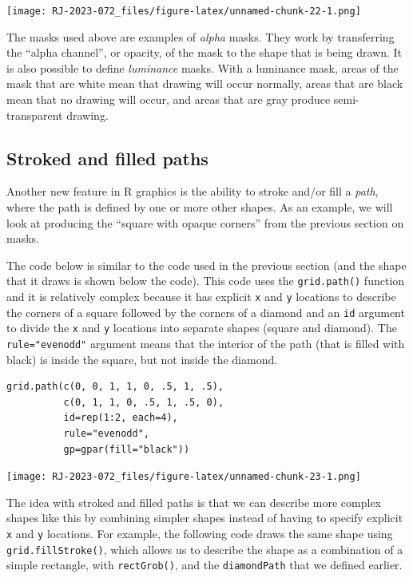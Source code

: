 \texttt{[image: RJ-2023-072\_files/figure-latex/unnamed-chunk-22-1.png]}

The masks used above are examples of \emph{alpha} masks. They work by
transferring the ``alpha channel'', or opacity, of the mask to the
shape that is being drawn.
It is also possible to define \emph{luminance} masks.
With a luminance mask, areas of the mask that are white mean that
drawing will occur normally, areas that are black mean that
no drawing will occur, and areas that are gray produce semi-transparent
drawing.

\hypertarget{stroked-and-filled-paths}{%
\subsection{Stroked and filled paths}\label{stroked-and-filled-paths}}

Another new feature in R graphics is the ability to stroke and/or fill
a \emph{path}, where the path is defined by one or more other shapes.
As an example, we will look at producing the ``square with opaque corners''
from the previous section on masks.

The code below is similar to the code used in the previous section
(and the shape that it draws is shown below the code).
This code uses the \texttt{grid.path()} function and it is relatively complex
because it has explicit \texttt{x} and \texttt{y} locations to describe the corners of
a square followed by the corners of a diamond and an \texttt{id} argument
to divide the \texttt{x} and \texttt{y} locations into separate shapes (square and diamond).
The \texttt{rule="evenodd"} argument means that the interior of the path
(that is filled with black) is inside the square, but not inside the diamond.

\begin{verbatim}
grid.path(c(0, 0, 1, 1, 0, .5, 1, .5),
          c(0, 1, 1, 0, .5, 1, .5, 0),
          id=rep(1:2, each=4),
          rule="evenodd",
          gp=gpar(fill="black"))
\end{verbatim}

\texttt{[image: RJ-2023-072\_files/figure-latex/unnamed-chunk-23-1.png]}

The idea with stroked and filled paths is that we can describe more
complex shapes like this by combining simpler shapes instead
of having to specify explicit \texttt{x} and \texttt{y} locations.
For example, the following code draws the same shape using
\texttt{grid.fillStroke()}, which allows us to describe the shape as a
combination of a simple rectangle, with \texttt{rectGrob()},
and the \texttt{diamondPath} that we defined
earlier.

